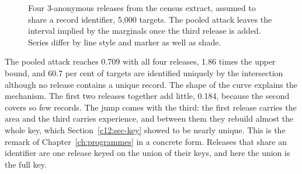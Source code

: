 \begin{figure}[ht]
\centering
{}
\caption{Four 3-anonymous releases from the census extract, assumed to share a record
identifier, 5,000 targets. The pooled attack leaves the interval implied by the
marginals once the third release is added. Series differ by line style and marker as
well as shade.}
\label{c12:fig-pool}
\end{figure}

The pooled attack reaches 0.709 with all four releases, 1.86 times the upper bound, and
60.7 per cent of targets are identified uniquely by the intersection although no
release contains a unique record.
The shape of the curve explains the mechanism. The first two releases together add
little, 0.184, because the second covers so few records. The jump comes with the third:
the first release carries the area and the third carries experience, and between them
they rebuild almost the whole key, which Section~\ref{c12:sec-key} showed to be nearly
unique. This is the remark of Chapter~\ref{ch:programmes} in a concrete form. Releases
that share an identifier are one release keyed on the union of their keys, and here the
union is the full key.


